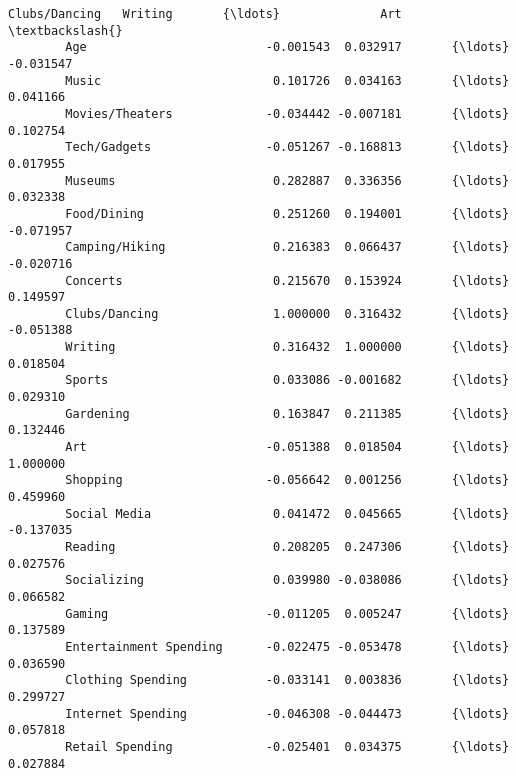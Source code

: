 \documentclass[11pt]{article}
\begin{document}
\begin{Verbatim}[commandchars=\\\{\}]
                                Clubs/Dancing   Writing       {\ldots}              Art  \textbackslash{}
        Age                         -0.001543  0.032917       {\ldots}        -0.031547   
        Music                        0.101726  0.034163       {\ldots}         0.041166   
        Movies/Theaters             -0.034442 -0.007181       {\ldots}         0.102754   
        Tech/Gadgets                -0.051267 -0.168813       {\ldots}         0.017955   
        Museums                      0.282887  0.336356       {\ldots}         0.032338   
        Food/Dining                  0.251260  0.194001       {\ldots}        -0.071957   
        Camping/Hiking               0.216383  0.066437       {\ldots}        -0.020716   
        Concerts                     0.215670  0.153924       {\ldots}         0.149597   
        Clubs/Dancing                1.000000  0.316432       {\ldots}        -0.051388   
        Writing                      0.316432  1.000000       {\ldots}         0.018504   
        Sports                       0.033086 -0.001682       {\ldots}         0.029310   
        Gardening                    0.163847  0.211385       {\ldots}         0.132446   
        Art                         -0.051388  0.018504       {\ldots}         1.000000   
        Shopping                    -0.056642  0.001256       {\ldots}         0.459960   
        Social Media                 0.041472  0.045665       {\ldots}        -0.137035   
        Reading                      0.208205  0.247306       {\ldots}         0.027576   
        Socializing                  0.039980 -0.038086       {\ldots}         0.066582   
        Gaming                      -0.011205  0.005247       {\ldots}         0.137589   
        Entertainment Spending      -0.022475 -0.053478       {\ldots}         0.036590   
        Clothing Spending           -0.033141  0.003836       {\ldots}         0.299727   
        Internet Spending           -0.046308 -0.044473       {\ldots}         0.057818   
        Retail Spending             -0.025401  0.034375       {\ldots}         0.027884   
        

\end{Verbatim}
\end{document}
